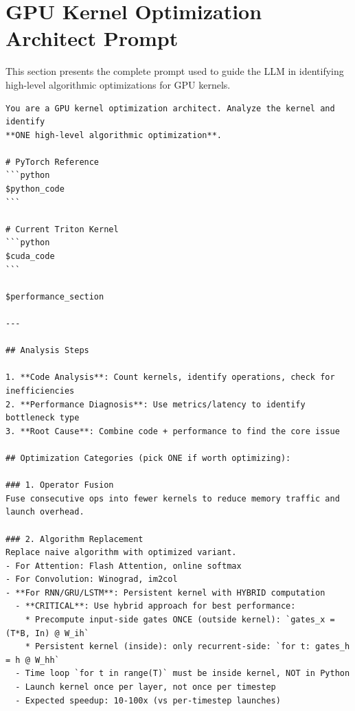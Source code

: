 \documentclass{article}
\theoremstyle{plain}
\theoremstyle{definition}
\theoremstyle{remark}
\begin{document}
\newpage
\appendix
\onecolumn
\section{GPU Kernel Optimization Architect Prompt}

This section presents the complete prompt used to guide the LLM in identifying high-level algorithmic optimizations for GPU kernels.

\begin{mdframed}[linewidth=1pt, linecolor=black, backgroundcolor=gray!5]
\begin{lstlisting}
You are a GPU kernel optimization architect. Analyze the kernel and identify
**ONE high-level algorithmic optimization**.

# PyTorch Reference
```python
$python_code
```

# Current Triton Kernel
```python
$cuda_code
```

$performance_section

---

## Analysis Steps

1. **Code Analysis**: Count kernels, identify operations, check for inefficiencies
2. **Performance Diagnosis**: Use metrics/latency to identify bottleneck type
3. **Root Cause**: Combine code + performance to find the core issue

## Optimization Categories (pick ONE if worth optimizing):

### 1. Operator Fusion
Fuse consecutive ops into fewer kernels to reduce memory traffic and launch overhead.

### 2. Algorithm Replacement
Replace naive algorithm with optimized variant.
- For Attention: Flash Attention, online softmax
- For Convolution: Winograd, im2col
- **For RNN/GRU/LSTM**: Persistent kernel with HYBRID computation
  - **CRITICAL**: Use hybrid approach for best performance:
    * Precompute input-side gates ONCE (outside kernel): `gates_x = (T*B, In) @ W_ih`
    * Persistent kernel (inside): only recurrent-side: `for t: gates_h = h @ W_hh`
  - Time loop `for t in range(T)` must be inside kernel, NOT in Python
  - Launch kernel once per layer, not once per timestep
  - Expected speedup: 10-100x (vs per-timestep launches)


\end{lstlisting}
\end{mdframed}
\end{document}
